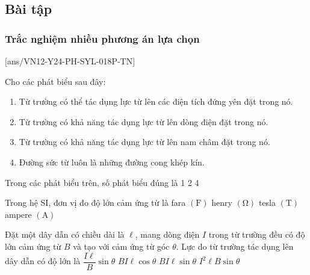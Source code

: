\subsection{Bài tập}
\subsubsection{Trắc nghiệm nhiều phương án lựa chọn}
\setcounter{ex}{0}
[ans/VN12-Y24-PH-SYL-018P-TN]
\begin{ex}
	Cho các phát biểu sau đây:
	\begin{enumerate}[label=(\arabic*)]
		\item Từ trường có thể tác dụng lực từ lên các điện tích đứng yên đặt trong nó.
		\item Từ trường có khả năng tác dụng lực từ lên dòng điện đặt trong nó.
		\item Từ trường có khả năng tác dụng lực từ lên nam châm đặt trong nó.
		\item Đường sức từ luôn là những đường cong khép kín.
	\end{enumerate}	
	Trong các phát biểu trên, số phát biểu đúng là
	\choice
	{1}
	{2}
	{}
	{4}
\end{ex}

\begin{ex}
	Trong hệ SI, đơn vị đo độ lớn cảm ứng từ là 	
	\choice
	{fara $\left(\si{\farad}\right)$}
	{henry $\left(\si{\ohm}\right)$}
	{\True tesla $\left(\si{\tesla}\right)$}
	{ampere $\left(\si{\ampere}\right)$}
	\loigiai{}
\end{ex}
\begin{ex}
	Đặt một dây dẫn có chiều dài là $\ell$, mang dòng điện $I$ trong từ trường đều có độ lớn cảm ứng từ $B$ và tạo với cảm ứng từ góc $\theta$. Lực do từ trường tác dụng lên dây dẫn có độ lớn là
	\choice
	{$\dfrac{I\ell}{B}\sin\theta$}
	{$BI\ell \cos\theta$}
	{\True $BI\ell\sin\theta$}
	{$I^2\ell B\sin\theta$}
	\loigiai{}
\end{ex}



